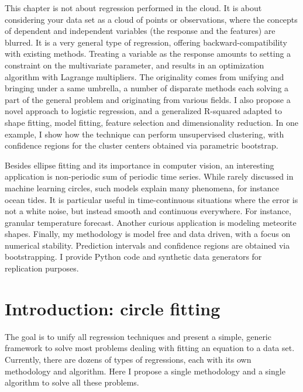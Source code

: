 \documentclass[oneside,10pt]{book}
\begin{document}
This chapter is not about regression performed in the cloud. It is about considering your data set as a cloud of points or observations, where the
 concepts of dependent and independent variables (the response and the features) are blurred. It is a very general type of regression, offering
 backward-compatibility with existing methods. Treating a variable as the response amounts to setting a constraint on the multivariate parameter, and results in an optimization algorithm with  Lagrange multipliers. The originality comes from unifying and bringing under a same umbrella, a number of disparate methods each solving a part of the general problem and originating from various fields. I also
 propose a novel approach to logistic regression, and a generalized R-squared adapted to shape fitting, model fitting, \textcolor{index}{feature selection}
and  \textcolor{index}{dimensionality reduction}.  In one example, I show how the technique can perform unsupervised clustering, with \textcolor{index}{confidence regions} for
 the cluster centers obtained via parametric bootstrap.

Besides ellipse fitting and its importance in \textcolor{index}{computer vision}, an interesting application is non-periodic sum of periodic time series. While rarely discussed in machine learning circles, such models explain many phenomena, for instance ocean tides. It is particular useful in time-continuous situations where the error is not a white noise, but instead smooth and continuous everywhere. For instance, granular temperature forecast.  Another curious application is modeling meteorite shapes. Finally, my methodology is model free and data driven, with a focus on \textcolor{index}{numerical stability}. Prediction intervals and confidence regions
 are obtained via bootstrapping. I provide Python code and \textcolor{index}{synthetic data} generators for replication purposes.

\hypersetup{linkcolor=red}




\section{Introduction: circle fitting}\label{circ1}

The goal is to unify all regression techniques and present a simple, generic  framework to solve
 most problems dealing with fitting an equation to a data set. Currently, there are dozens of types of regressions, each with its own
 methodology and algorithm. Here I propose a single methodology and a single algorithm to solve all these problems.
\end{document}

